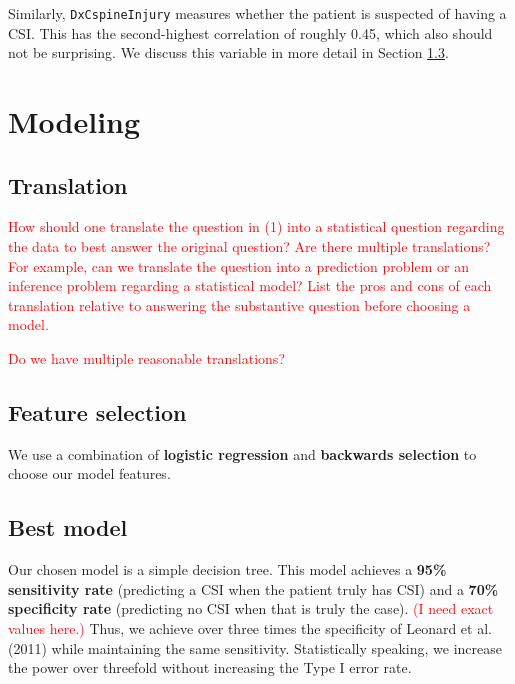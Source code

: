 \documentclass[
]{article}
\begin{document}
Similarly, \texttt{DxCspineInjury} measures whether the patient is
suspected of having a CSI. This has the second-highest correlation of
roughly 0.45, which also should not be surprising. We discuss this
variable in more detail in Section \textcolor{blue}{\ref{sec:best}}.

\hypertarget{sec:modeling}{%
\section{Modeling}\label{sec:modeling}}

\hypertarget{translation}{%
\subsection{Translation}\label{translation}}

\textcolor{red}{How should one translate the question in (1) into a statistical question regarding the data to best answer the original question? Are there multiple translations? For example, can we translate the question into a prediction problem or an inference problem regarding a statistical model? List the pros and cons of each translation relative to answering the substantive question before choosing a model.}

\textcolor{red}{Do we have multiple reasonable translations?}

\hypertarget{sec:feat-sel}{%
\subsection{Feature selection}\label{sec:feat-sel}}

We use a combination of \textbf{logistic regression} and
\textbf{backwards selection} to choose our model features.

\hypertarget{sec:best}{%
\subsection{Best model}\label{sec:best}}

Our chosen model is a simple decision tree. This model achieves a
\textbf{95\% sensitivity rate} (predicting a CSI when the patient truly
has CSI) and a \textbf{70\% specificity rate} (predicting no CSI when
that is truly the case). \textcolor{red}{(I need exact values here.)}
Thus, we achieve over three times the specificity of Leonard et al.
(2011) while maintaining the same sensitivity. Statistically speaking,
we increase the power over threefold without increasing the Type I error
rate.
\end{document}
